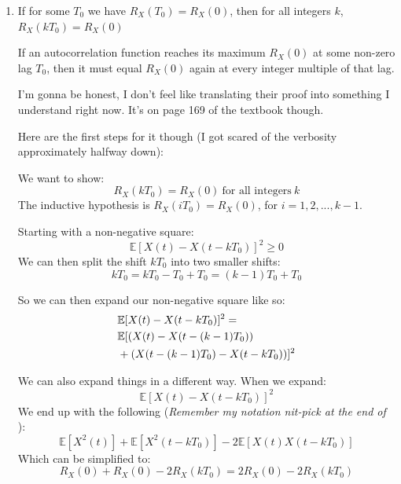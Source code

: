 \begin{enumerate}
\begin{derivation}
		      Now onto the Cauchy-Scharz Version: \\
		      Keep in mind we are trying to show that \(\abs{R_X(\tau)} \leq R_X(0)\).
		      We should briefly introduce the Cauchy–Schwarz inequality:
		      \[
			      \abs{\mathbb{E}[UV]} \leq \sqrt{\mathbb{E}[U^2]\mathbb{E}[V^2]}
		      \]
		      This little inequality actually makes the proof shorter.
		      By setting \(U=X(t)\) and \(V=X(t-\tau)\):
		      \[
			      \abs{R_X(\tau)} = \abs{\mathbb{E}[X(t)X(t-\tau)]}
			      \leq \sqrt{\mathbb{E}[X^2(t)]\mathbb{E}[X^2(t-\tau)]}
			      = R_X(0)
		      \]
	      \end{derivation}
	\item If for some \(T_0\) we have \(R_X(T_0)= R_X(0)\), then for all integers \(k\),\\
	      \(R_X(kT_0)=R_X(0)\)
	      \begin{idea}
		      If an autocorrelation function reaches its maximum
		      \(R_X(0)\) at some non-zero lag \(T_0\), then it must equal \(R_X(0)\)
		      again at every integer multiple of that lag.
	      \end{idea}

	      \begin{derivation}
		      I'm gonna be honest, I don't feel like translating their proof into
		      something I understand right now. It's on page 169 of the textbook
		      though.

		      Here are the first steps for it though (I got scared of the verbosity
		      approximately halfway down):

		      We want to show:
		      \[
			      R_X(kT_0)=R_X(0)\ \text{for all integers}\ k
		      \]
		      The inductive hypothesis is \(R_X(iT_0) = R_X(0)\), for \(i = 1,2,...,k-1\).

		      Starting with a non-negative square:
		      \[
			      \mathbb{E}[X(t)-X(t-kT_0)]^2 \geq 0
		      \]
		      We can then split the shift \(kT_0\) into two smaller shifts:
		      \[
			      kT_0 = kT_0 - T_0 + T_0 = (k-1)T_0 + T_0
		      \]

		      So we can then expand our non-negative square like so:
		      \begin{align}
			       & \mathbb{E}[X(t)-X(t-kT_0)]^2 =  \notag \\
			       & \mathbb{E}[(X(t)-X(t-(k-1)T_0)) \notag \\
			       & +(X(t-(k-1)T_0)-X(t-kT_0))]^2
			      \label{eq:nonnegative-square}
		      \end{align}

		      We can also expand things in a different way. When we expand:
		      \[
			      \mathbb{E}[X(t)-X(t-kT_0)]^2
		      \]
		      We end up with the following
		      (\textit{Remember my notation nit-pick at the end of }):
		      \[
			      \mathbb{E}[X^2(t)] + \mathbb{E}[X^2(t-kT_0)]
			      - 2\mathbb{E}[X(t)X(t-kT_0)]
		      \]
		      Which can be simplified to:
		      \[
			      R_X(0) + R_X(0) - 2R_X(kT_0) = 2R_X(0) - 2R_X(kT_0)
		      \]
	      \end{derivation}
\end{enumerate}

